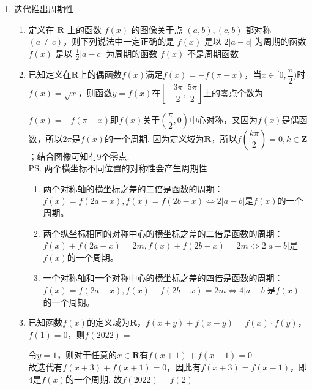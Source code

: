 \begin{enumerate}
\begin{enumerate}
\begin{jieda}
        设$g(x) = f(x)+x$，则$g(x)$为奇函数，增函数.$f(t)+t + f(2t-1)+(2t-1) \leq 0$即$g(t)+g(2t-1) \leq 0$，故$3t-1 \leq 0$，即$t \leq \dfrac{1}{3}$
    \end{jieda}
\end{enumerate}
\item 迭代推出周期性
\begin{enumerate}
    \item 定义在 $\mathbf{R}$ 上的函数 $f\left( x\right)$ 的图像关于点 $\left( {a,b}\right) ,\left( {c,b}\right)$ 都对称 $\left( {a \neq  c}\right)$，则下列说法中一定正确的是
    {$f\left( x\right)$ 是以 $2\left| {a - c}\right|$ 为周期的函数}
    {$f\left( x\right)$ 是以 $\frac{1}{2}\left| {a - c}\right|$ 为周期的函数}
    {$f\left( x\right)$ 不是周期函数}
    \item 已知定义在$\mathbf{R}$上的偶函数$f(x)$满足$f(x) = -f(\pi - x)$，当$x \in [0, \dfrac{\pi}{2})$时$f(x) = \sqrt{x}$，则函数$y = f(x)$在$\left[-\dfrac{3\pi}{2}, \dfrac{5\pi}{2}\right]$上的零点个数为
    \begin{jieda}
        $f(x) = -f(\pi - x)$即$f(x)$关于$\left(\dfrac{\pi}{2}, 0\right)$中心对称，又因为$f(x)$是偶函数，所以$2\pi$是$f(x)$的一个周期. 因为定义域为$\mathbf{R}$，所以$f\left(\dfrac{k\pi}{2}\right) = 0, k \in \mathbf{Z}$；结合图像可知有9个零点. \\
    \ps 两个横坐标不同位置的对称性会产生周期性
    \begin{enumerate}
        \item 两个对称轴的横坐标之差的二倍是函数的周期：$f(x) = f(2a-x), f(x) = f(2b - x) \Longleftrightarrow 2|a-b|$是$f(x)$的一个周期。
        \item 两个纵坐标相同的对称中心的横坐标之差的二倍是函数的周期：$f(x) + f(2a-x) = 2m, f(x) + f(2b - x) = 2m \Longleftrightarrow 2|a-b|$是$f(x)$的一个周期。
        \item 一个对称轴和一个对称中心的横坐标之差的四倍是函数的周期：$f(x) = f(2a-x), f(x) + f(2b - x) = 2m \Longleftrightarrow 4|a-b|$是$f(x)$的一个周期。
    \end{enumerate}
    \end{jieda}
    \item 已知函数$f(x)$的定义域为$\mathbf{R}$，$f(x+y)+f(x-y) = f(x) \cdot f(y)$，$f(1) = 0$，则$f(2022) = $
    \begin{jieda}
        令$y = 1$，则对于任意的$x \in \mathbf{R}$有$f(x+1) + f(x-1) = 0$ \\ 故迭代有$f(x+3) + f(x+1) = 0$，因此有$f(x + 3) = f(x-1)$，即$4$是$f(x)$的一个周期. 故$f(2022) = f(2)$\\

\end{jieda}
\end{enumerate}
\end{enumerate}
